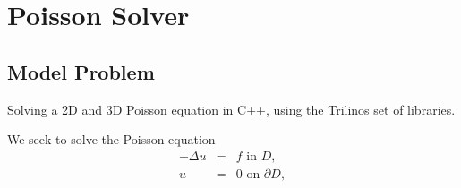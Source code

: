 \newtheorem{assumption}{Assumption}
\newtheorem{hypothesis}{Hypothesis}
\newtheorem{theorem}{Theorem}
\newtheorem{defi}{Definition}
\newtheorem{prop}{Proposition}
\newtheorem{lem}{Lemma}
\newtheorem{rem}{Remark}
\newcommand{\bx}{\mathbf{x}}
\newcommand{\by}{\mathbf{y}}
\newcommand{\bu}{\mathbf{u}}
\newcommand{\bg}{\mathbf{g}}
\newcommand{\be}{\mathbf{e}}
\newcommand{\bv}{\mathbf{v}}
\newcommand{\bz}{\mathbf{z}}
\newcommand{\buu}{\mathbf{U}}
\newcommand{\bV}{\mathbf{V}}
\newcommand{\bR}{\mathbf{R}}
\newcommand{\bff}{\mathbf{f}}
\newcommand{\bX}{\mathbf{X}}
\newcommand{\bA}{\mathbf{A}}
\newcommand{\bK}{\mathbf{K}}
\newcommand{\bI}{\mathbf{I}}
\newcommand{\bE}{\mathbf{E}}
\newcommand{\bB}{\mathbf{B}}
\newcommand{\bL}{\mathbf{L}}
\newcommand{\bb}{\mathbf{b}}
\newcommand{\bc}{\mathbf{c}}
\newcommand{\bM}{\mathbf{M}}
\newcommand{\br}{\mathbf{r}}
\newcommand{\btheta}{\boldsymbol{\theta}}
\newcommand{\bbeta}{\boldsymbol{\beta}}
\newcommand{\bzero}{\mathbf{0}}
\newcommand{\bvarphi}{\boldsymbol{\varphi}}
\newcommand{\bPhi}{\boldsymbol{\Phi}}
\newcommand{\balpha}{\boldsymbol{\alpha}}
\newcommand{\bxi}{\boldsymbol{\xi}}
\newcommand{\bgamma}{\boldsymbol{\gamma}}
\newcommand{\btau}{\boldsymbol{\tau}}
\newcommand{\bnabla}{\boldsymbol{\nabla}}
\newcommand{\uth}{u^{\btheta}}
\newcommand{\fth}{f^{\btheta}}
\newcommand{\gth}{g^{\btheta}}
\newcommand{\vth}{v^{\btheta}}
\newcommand{\wth}{w^{\btheta}}
\newcommand{\zth}{z^{\btheta}}
\newcommand{\ba}{\mathbf{a}}
\newcommand{\bw}{\mathbf{w}}
\newcommand{\etk}{\eta^k}
\newcommand{\xik}{\xi^k}
\newcommand{\bbth}{{\mathbf{b}}^{\theta_3}}
\newcommand{\xiav}{\langle \bxi \rangle}
\newcommand*{\Scale}[2][4]{\scalebox{#1}{$#2$}}%
\reversemarginpar

\section{Poisson Solver}
\subsection{Model Problem}

Solving a 2D and 3D Poisson equation in C++, using the Trilinos set of libraries.


We seek to solve the Poisson equation
\begin{eqnarray}
-\Delta u &=& f \mbox{ in } D,\label{eq:1}\\[1ex]
%
u &=& 0 \mbox{ on } \partial D,\label{eq:2}
\end{eqnarray}

